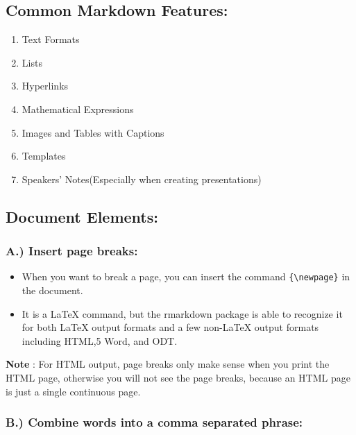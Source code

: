 \documentclass[
]{article}
\providecommand{\tightlist}{%
  \setlength{\itemsep}{0pt}\setlength{\parskip}{0pt}}
\begin{document}
\hypertarget{common-markdown-features}{%
\subsection{Common Markdown Features:}\label{common-markdown-features}}

\begin{enumerate}
\def\labelenumi{\arabic{enumi}.}
\tightlist
\item
  Text Formats
\item
  Lists
\item
  Hyperlinks
\item
  Mathematical Expressions
\item
  Images and Tables with Captions
\item
  Templates
\item
  Speakers' Notes(Especially when creating presentations)
\end{enumerate}

\hypertarget{document-elements}{%
\subsection{Document Elements:}\label{document-elements}}

\hypertarget{a.-insert-page-breaks}{%
\subsubsection{A.) Insert page breaks:}\label{a.-insert-page-breaks}}

\begin{itemize}
\tightlist
\item
  When you want to break a page, you can insert the command
  \texttt{\{\textbackslash{}newpage\}} in the document.
\item
  It is a LaTeX command, but the rmarkdown package is able to recognize
  it for both LaTeX output formats and a few non-LaTeX output formats
  including HTML,5 Word, and ODT.
\end{itemize}

\textbf{Note} : For HTML output, page breaks only make sense when you
print the HTML page, otherwise you will not see the page breaks, because
an HTML page is just a single continuous page.

\hypertarget{b.-combine-words-into-a-comma-separated-phrase}{%
\subsubsection{B.) Combine words into a comma separated
phrase:}\label{b.-combine-words-into-a-comma-separated-phrase}}
\end{document}

